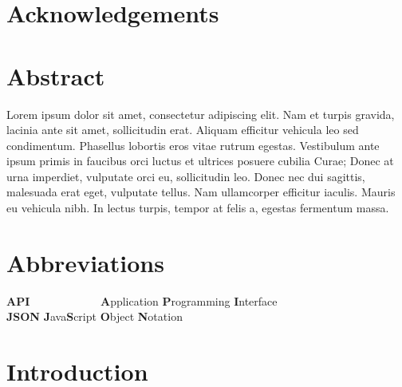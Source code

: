 \documentclass[12pt,a4paper,]{report}
\begin{document}
\chapter*{Acknowledgements}\label{acknowledgements}

\newpage

\chapter*{Abstract}\label{abstract}

Lorem ipsum dolor sit amet, consectetur adipiscing elit. Nam et turpis
gravida, lacinia ante sit amet, sollicitudin erat. Aliquam efficitur
vehicula leo sed condimentum. Phasellus lobortis eros vitae rutrum
egestas. Vestibulum ante ipsum primis in faucibus orci luctus et
ultrices posuere cubilia Curae; Donec at urna imperdiet, vulputate orci
eu, sollicitudin leo. Donec nec dui sagittis, malesuada erat eget,
vulputate tellus. Nam ullamcorper efficitur iaculis. Mauris eu vehicula
nibh. In lectus turpis, tempor at felis a, egestas fermentum massa.

\newpage 
{}
\setcounter{page}{1}


\tableofcontents

\newpage

\listoffigures

\newpage

\listoftables

\newpage

\chapter*{Abbreviations}\label{abbreviations}

\begin{tabbing}
\textbf{API}~~~~~~~~~~~~ \= \textbf{A}pplication \textbf{P}rogramming \textbf{I}nterface \\  
\textbf{JSON} \> \textbf{J}ava\textbf{S}cript \textbf{O}bject \textbf{N}otation \\  
\end{tabbing}

\newpage

\setcounter{page}{1}
\doublespacing
\setlength{\parindent}{0.5in}

\chapter{Introduction}\label{introduction}
\end{document}
